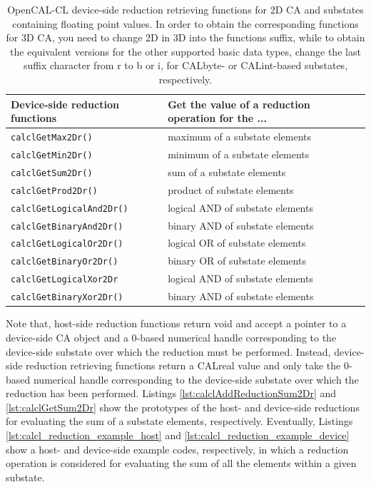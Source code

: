 \begin{table}
  \centering
  \footnotesize
  \begin{tabular}{l|l}
    \hline
    Device-side reduction functions & Get the value of a reduction operation for the ... \\
    \hline
    \verb'calclGetMax2Dr()'        & maximum of a substate elements\\
    \verb'calclGetMin2Dr()'        & minimum of a substate elements\\
    \verb'calclGetSum2Dr()'        & sum of a substate elements\\
    \verb'calclGetProd2Dr()'       & product of substate elements\\
    \verb'calclGetLogicalAnd2Dr()' & logical AND of substate elements\\
    \verb'calclGetBinaryAnd2Dr()'  & binary AND of substate elements\\
    \verb'calclGetLogicalOr2Dr()'  & logical OR of substate elements\\
    \verb'calclGetBinaryOr2Dr()'   & binary OR of substate elements\\
    \verb'calclGetLogicalXor2Dr'   & logical AND of substate elements\\
    \verb'calclGetBinaryXor2Dr()'  & binary AND of substate elements\\
    \hline
  \end{tabular}
  \caption{OpenCAL-CL device-side reduction retrieving functions for 2D CA and
    substates containing floating point values. In order to obtain the
    corresponding functions for 3D CA, you need to change 2D in 3D
    into the functions suffix, while to obtain the equivalent
    versions for the other supported basic data types, change the last
    suffix character from r to b or i, for CALbyte- or CALint-based
    substates, respectively.}
  \label{tab:calcl-device-reductions}
\end{table}


Note that, host-side reduction functions return void and accept a
pointer to a device-side CA object and a 0-based numerical handle
corresponding to the device-side substate over which the reduction
must be performed. Instead, device-side reduction retrieving functions
return a CALreal value and only take the 0-based numerical handle
corresponding to the device-side substate over which the reduction has
been performed. Listings \ref{lst:calclAddReductionSum2Dr} and
\ref{lst:calclGetSum2Dr} show the prototypes of the host- and
device-side reductions for evaluating the sum of a substate elements,
respectively. Eventually, Listings
\ref{lst:calcl_reduction_example_host} and
\ref{lst:calcl_reduction_example_device} show a host- and device-side
example codes, respectively, in which a reduction operation is
considered for evaluating the sum of all the elements within a given
substate.

